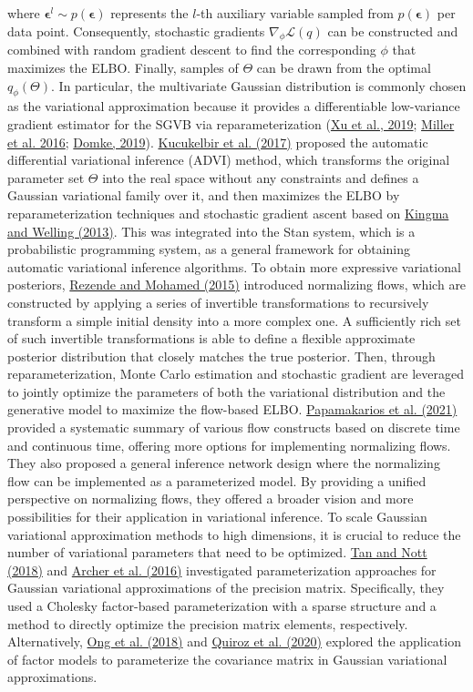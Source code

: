 \documentclass[12pt,a4paper]{article}
\begin{document}
where $\bm{\epsilon}^l \sim p(\bm{\epsilon})$ represents the $l$-th auxiliary variable sampled from $p(\bm{\epsilon})$ per data point. Consequently, stochastic gradients $\nabla_{\phi} \mathcal{L}(q)$ can be constructed and combined with random gradient descent to find the corresponding $\phi$ that maximizes the ELBO. Finally, samples of $\Theta$ can be drawn from the optimal $q_{\phi}(\Theta)$. In particular, the multivariate Gaussian distribution is commonly chosen as the variational approximation because it provides a differentiable low-variance gradient estimator for the SGVB via reparameterization (\hyperref[xu2019]{Xu et al., 2019}; \hyperref[miller2016]{Miller et al. 2016}; \hyperref[domke2019]{Domke, 2019}). \hyperref[Kucukelbir2016]{Kucukelbir et al. (2017)} proposed the automatic differential variational inference (ADVI) method, which transforms the original parameter set $\Theta$ into the real space without any constraints and defines a Gaussian variational family over it, and then maximizes the ELBO by reparameterization techniques and stochastic gradient ascent based on \hyperref[kingma2013]{Kingma and Welling (2013)}. This was integrated into the Stan system, which is a probabilistic programming system, as a general framework for obtaining automatic variational inference algorithms. To obtain more expressive variational posteriors, \hyperref[rezende2015]{Rezende and Mohamed (2015)} introduced normalizing flows, which are constructed by applying a series of invertible transformations to recursively transform a simple initial density into a more complex one. A sufficiently rich set of such invertible transformations is able to define a flexible approximate posterior distribution that closely matches the true posterior. Then, through reparameterization, Monte Carlo estimation and stochastic gradient are leveraged to jointly optimize the parameters of both the variational distribution and the generative model to maximize the flow-based ELBO. \hyperref[papa2021]{Papamakarios et al. (2021)} provided a systematic summary of various flow constructs based on discrete time and continuous time, offering more options for implementing normalizing flows. They also proposed a general inference network design where the normalizing flow can be implemented as a parameterized model. By providing a unified perspective on normalizing flows, they offered a broader vision and more possibilities for their application in variational inference.
To scale Gaussian variational approximation methods to high dimensions, it is crucial to reduce the number of variational parameters that need to be optimized. \hyperref[tan2018]{Tan and Nott (2018)} and \hyperref[archer2016]{Archer et al. (2016)} investigated parameterization approaches for Gaussian variational approximations of the precision matrix. Specifically, they used a Cholesky factor-based parameterization with a sparse structure and a method to directly optimize the precision matrix elements, respectively. Alternatively, \hyperref[ong2018]{Ong et al. (2018)} and \hyperref[quiroz2020]{Quiroz et al. (2020)} explored the application of factor models to parameterize the covariance matrix in Gaussian variational approximations. 
\end{document}
